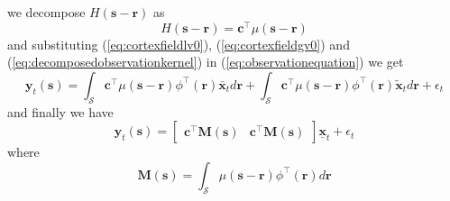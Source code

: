 \documentclass[a4paper,12pt]{article}
\begin{document}
 we decompose $ H(\mathbf s-\mathbf r)$ as
 \begin{equation}
  H(\mathbf s-\mathbf r)= \mathbf c^{\top}\mu(\mathbf s-\mathbf r)
\label{eq:decomposedobservationkernel} 
\end{equation}
and substituting  (\ref{eq:cortexfieldlv0}), (\ref{eq:cortexfieldgv0}) and (\ref{eq:decomposedobservationkernel}) in (\ref{eq:observationequation}) we get
\begin{equation}
 \mathbf y_t(\mathbf s)=\int_{\mathcal S}\mathbf c^{\top}\mu(\mathbf s-\mathbf r)\phi^{\top}(\mathbf r)\bar{\mathbf x}_{t}d\mathbf r+\int_{\mathcal S}\mathbf c^{\top}\mu(\mathbf s-\mathbf r)\phi^{\top}(\mathbf r)\tilde{\mathbf x}_{t}d\mathbf r+\epsilon_t
\end{equation}
and finally we have
\begin{equation}
\mathbf y_t(\mathbf s)= \begin{bmatrix}\mathbf c^{\top}\mathbf M(\mathbf s)&\mathbf c^{\top}\mathbf M(\mathbf s)\end{bmatrix}\underline{\mathbf x}_t+\epsilon_t
\end{equation}
where
\begin{equation}
 \mathbf M(\mathbf s)=\int_{\mathcal S}\mu(\mathbf s-\mathbf r)\phi^{\top}(\mathbf r)d\mathbf r
\end{equation}
\end{document}
